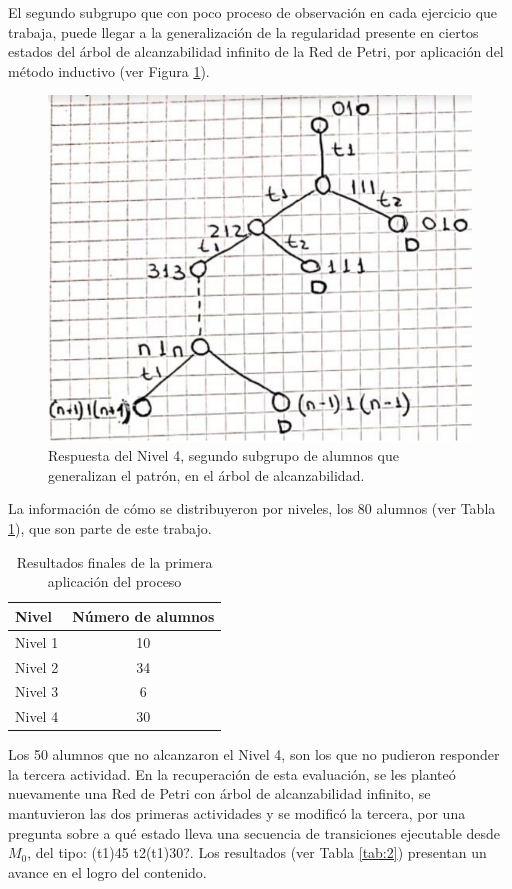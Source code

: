 \documentclass[oneside,spanish]{amsart}
\numberwithin{equation}{section}
\theoremstyle{definition}
\begin{document}
\begin{itemize}
	El segundo subgrupo que con poco proceso de observación en cada ejercicio que trabaja, puede llegar a la generalización de la regularidad presente en ciertos estados del árbol de alcanzabilidad infinito de la Red de Petri, por aplicación del método inductivo (ver Figura \ref{fig:5}).
	
	\begin{figure}[h]
		\centering
		\includegraphics[width=0.5\linewidth]{Anexos-07/Imagen5}
		\caption{Respuesta del Nivel 4, segundo subgrupo de alumnos que generalizan el patrón, en el árbol de alcanzabilidad.}
		\label{fig:5}
	\end{figure}
\end{itemize}

La información de cómo se distribuyeron por niveles, los 80 alumnos (ver Tabla \ref{tab:1}), que son parte de este trabajo.

\begin{table}[h]
	\centering
	\def\arraystretch{1.25}
	\begin{tabular}[h]{|l|c|}
		\hline
		Nivel	&	Número de alumnos\\\hline
		Nivel 1	&	10\\\hline
		Nivel 2	&	34\\\hline
		Nivel 3	&	6\\\hline
		Nivel 4	&	30\\
		\hline
	\end{tabular}
	\caption{Resultados finales de la primera aplicación del proceso}
	\label{tab:1}
\end{table}

Los 50 alumnos que no alcanzaron el Nivel 4, son los que no pudieron responder la tercera actividad. En la recuperación de esta evaluación, se les planteó nuevamente una Red de Petri con árbol de alcanzabilidad infinito, se mantuvieron las dos primeras actividades y se modificó la tercera, por una pregunta sobre a qué estado lleva una secuencia de transiciones ejecutable desde $M_0$, del tipo: (t1)45 t2(t1)30?. Los resultados (ver Tabla \ref{tab:2}) presentan un avance en el logro del contenido.
\end{document}
